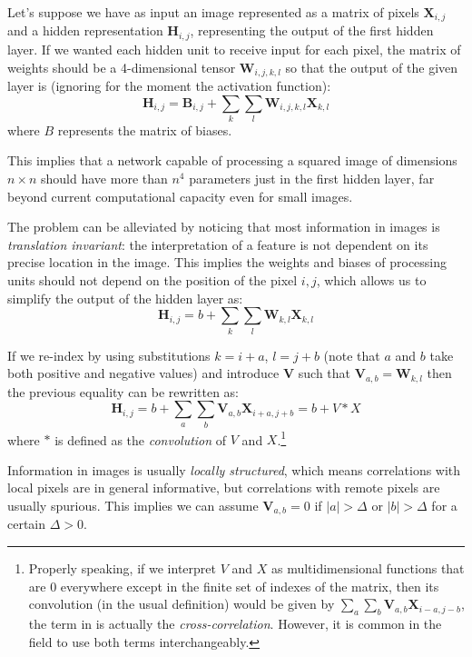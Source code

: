 Let's suppose we have as input an image represented as a matrix of pixels \( \mathbf{X}_{i,j} \) and a hidden representation \( \mathbf{H}_{i,j} \), representing the output of the first hidden layer. If we wanted each hidden unit to receive input for each pixel, the matrix of weights should be a 4-dimensional tensor \( \mathbf{W}_{i, j, k, l} \) so that the output of the given layer is (ignoring for the moment the activation function):
\[  \mathbf{H}_{i,j}  = \mathbf{B}_{i, j} + \sum_{k} \sum_{l} \mathbf{W}_{i, j, k, l} \mathbf{X}_{k, l} \]
where \( B \) represents the matrix of biases.

This implies that a network capable of processing a squared image of dimensions \( n \times n \) should have more than \( n^4 \) parameters just in the first hidden layer, far beyond current computational capacity even for small images.

The problem can be alleviated by noticing that most information in images is \textit{translation invariant}: the interpretation of a feature is not dependent on its precise location in the image. This implies the weights and biases of processing units should not depend on the position of the pixel \( i, j \), which allows us to simplify the output of the hidden layer as:
\[  \mathbf{H}_{i,j}  = b + \sum_{k} \sum_{l} \mathbf{W}_{k, l} \mathbf{X}_{k, l} \]

If we re-index by using substitutions \( k = i + a \), \( l = j + b \) (note that \( a \) and \( b \) take both positive and negative values) and introduce \( \mathbf{V} \) such that \( \mathbf{V}_{a, b} = \mathbf{W}_{k, l} \) then the previous equality can be rewritten as:
\begin{equation} \label{eq:convolution}
    \mathbf{H}_{i, j} =  b + \sum_a \sum_b \mathbf{V}_{a,b} \mathbf{X}_{i + a, j + b} = b + V \ast X
\end{equation}
where \( \ast \) is defined as the \textit{convolution} of \( V \) and \( X \).\footnote{Properly speaking, if we interpret \( V \) and \( X \) as multidimensional functions that are \( 0 \) everywhere except in the finite set of indexes of the matrix, then its convolution (in the usual definition) would be given by \( \sum_a \sum_b \mathbf{V}_{a,b} \mathbf{X}_{i - a, j - b} \), the term in  is actually the \textit{cross-correlation}. However, it is common in the field to use both terms interchangeably.}

Information in images is usually \textit{locally structured}, which means correlations with local pixels are in general informative, but correlations with remote pixels are usually spurious. This implies we can assume \( \mathbf{V}_{a,b} = 0 \) if \( |a| > \Delta \) or \( |b| > \Delta \) for a certain \( \Delta > 0\). 

